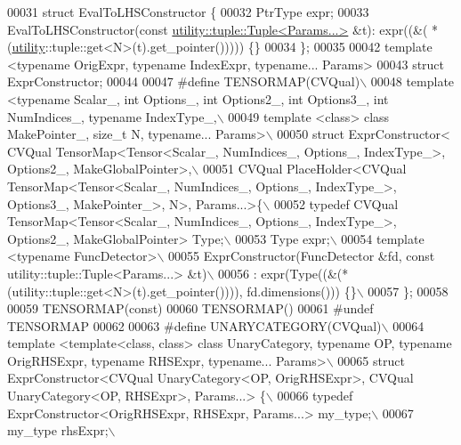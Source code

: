 \begin{DoxyCode}
00031 \textcolor{keyword}{struct }EvalToLHSConstructor \{
00032   PtrType expr;
00033   EvalToLHSConstructor(\textcolor{keyword}{const} \hyperlink{structutility_1_1tuple_1_1_tuple}{utility::tuple::Tuple<Params...>} &t): expr((&(
      *(\hyperlink{namespaceutility}{utility}::tuple::get<N>(t).get\_pointer())))) \{\}
00034 \};
00035 
00042 \textcolor{keyword}{template} <\textcolor{keyword}{typename} OrigExpr, \textcolor{keyword}{typename} IndexExpr, \textcolor{keyword}{typename}... Params>
00043 \textcolor{keyword}{struct }ExprConstructor;
00044 
00047 \textcolor{preprocessor}{#define TENSORMAP(CVQual)\(\backslash\)}
00048 \textcolor{preprocessor}{template <typename Scalar\_, int Options\_, int Options2\_, int Options3\_, int NumIndices\_, typename
       IndexType\_,\(\backslash\)}
00049 \textcolor{preprocessor}{template <class> class MakePointer\_, size\_t N, typename... Params>\(\backslash\)}
00050 \textcolor{preprocessor}{struct ExprConstructor< CVQual TensorMap<Tensor<Scalar\_, NumIndices\_, Options\_, IndexType\_>, Options2\_,
       MakeGlobalPointer>,\(\backslash\)}
00051 \textcolor{preprocessor}{CVQual PlaceHolder<CVQual TensorMap<Tensor<Scalar\_, NumIndices\_, Options\_, IndexType\_>, Options3\_,
       MakePointer\_>, N>, Params...>\{\(\backslash\)}
00052 \textcolor{preprocessor}{  typedef  CVQual TensorMap<Tensor<Scalar\_, NumIndices\_, Options\_, IndexType\_>, Options2\_,
       MakeGlobalPointer>  Type;\(\backslash\)}
00053 \textcolor{preprocessor}{  Type expr;\(\backslash\)}
00054 \textcolor{preprocessor}{  template <typename FuncDetector>\(\backslash\)}
00055 \textcolor{preprocessor}{  ExprConstructor(FuncDetector &fd, const utility::tuple::Tuple<Params...> &t)\(\backslash\)}
00056 \textcolor{preprocessor}{  : expr(Type((&(*(utility::tuple::get<N>(t).get\_pointer()))), fd.dimensions())) \{\}\(\backslash\)}
00057 \textcolor{preprocessor}{\};}
00058 
00059 TENSORMAP(\textcolor{keyword}{const})
00060 TENSORMAP()
00061 \textcolor{preprocessor}{#undef TENSORMAP}
00062 
00063 \textcolor{preprocessor}{#define UNARYCATEGORY(CVQual)\(\backslash\)}
00064 \textcolor{preprocessor}{template <template<class, class> class UnaryCategory, typename OP, typename OrigRHSExpr, typename RHSExpr,
       typename... Params>\(\backslash\)}
00065 \textcolor{preprocessor}{struct ExprConstructor<CVQual UnaryCategory<OP, OrigRHSExpr>, CVQual UnaryCategory<OP, RHSExpr>, Params...>
       \{\(\backslash\)}
00066 \textcolor{preprocessor}{  typedef  ExprConstructor<OrigRHSExpr, RHSExpr, Params...> my\_type;\(\backslash\)}
00067 \textcolor{preprocessor}{  my\_type rhsExpr;\(\backslash\)}

\end{DoxyCode}
